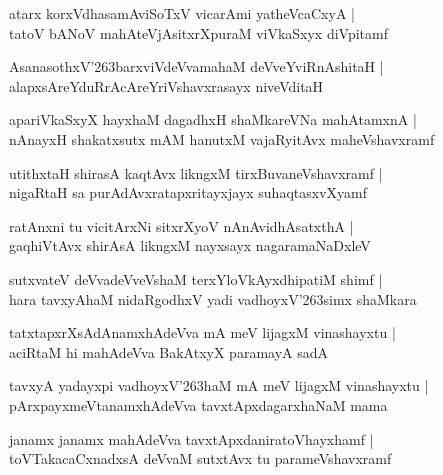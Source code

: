 \documentclass[twoside,12pt,openright]{book}
\def\S{\char'263}
\newcounter{shloka}[chapter]
\begin{document}
\begin{shloka}
atarx korxVdhasamAviSoTxV vicarAmi yatheVcaCxyA |\\
tatoV bANoV mahAteVjAsitxrXpuraM viVkaSxyx diVpitamf 
\end{shloka}

\begin{shloka}
AsanasothxV\S barxviVdeVvamahaM deVveYviRnAshitaH |\\
alapxsAreYduRrAcAreYriVshavxrasayx niveVditaH 
\end{shloka}

\begin{shloka}
apariVkaSxyX hayxhaM dagadhxH shaMkareVNa mahAtamxnA |\\
nAnayxH shakatxsutx mAM hanutxM vajaRyitAvx maheVshavxramf 
\end{shloka}

\begin{shloka}

utithxtaH shirasA kaqtAvx likngxM tirxBuvaneVshavxramf |\\
nigaRtaH sa purAdAvxratapxritayxjayx suhaqtasxvXyamf 
\end{shloka}

\begin{shloka}
ratAnxni tu vicitArxNi sitxrXyoV nAnAvidhAsatxthA |\\
gaqhiVtAvx shirAsA likngxM nayxsayx nagaramaNaDxleV 
\end{shloka}

\begin{shloka}
sutxvateV deVvadeVveVshaM terxYloVkAyxdhipatiM shimf |\\
hara tavxyAhaM nidaRgodhxV  yadi vadhoyxV\S simx shaMkara
\end{shloka}

\begin{shloka}
tatxtapxrXsAdAnamxhAdeVva mA meV lijagxM vinashayxtu |\\
aciRtaM hi mahAdeVva BakAtxyX paramayA sadA
\end{shloka}

\begin{shloka}
tavxyA yadayxpi vadhoyxV\S haM mA meV lijagxM vinashayxtu |\\
pArxpayxmeVtanamxhAdeVva tavxtApxdagarxhaNaM mama
\end{shloka}

\begin{shloka}
janamx janamx mahAdeVva tavxtApxdaniratoVhayxhamf |\\
toVTakacaCxnadxsA deVvaM sutxtAvx tu parameVshavxramf
\end{shloka}
\end{document}
